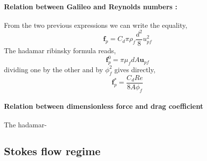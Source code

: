 \paragraph{Relation between Galileo and Reynolds numbers :}
From the two previous expressions we can write the equality, 
\begin{equation*}
    \textbf{f}_p = C_d  \pi \rho_f \frac{d^2}{8} u_{pf}^2
\end{equation*} 
The hadamar ribinsky formula reads, 
\begin{equation*}
    \textbf{f}_p^0 =\pi \mu_f d A \textbf{u}_{pf}
\end{equation*}
dividing one by the other and by $\phi_f^2$ gives directly, 
\begin{equation*}
    \textbf{f}_p^* =   \frac{C_d  Re}{8 A \phi_f} 
\end{equation*}

\paragraph{Relation between dimensionless force and drag coefficient}

The hadamar-


\subsection{Stokes flow regime}


